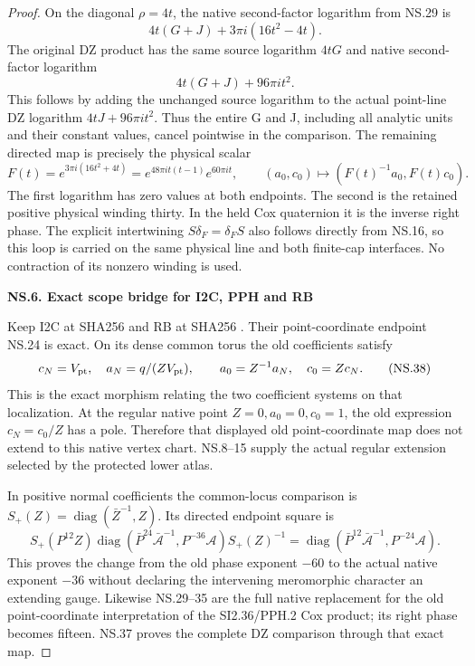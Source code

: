 \begin{proof}
On the diagonal \(\rho=4t\), the native second-factor logarithm
from NS.29 is
\[
       4t(G+J)+3\pi i(16t^2-4t).
\]
The original DZ product has the same source logarithm \(4tG\)
and native second-factor logarithm
\[
                         4t(G+J)+96\pi it^2.
\]
This follows by adding the unchanged source logarithm to the actual
point-line DZ logarithm \(4tJ+96\pi it^2\). Thus the entire G and J,
including all analytic units and their constant values, cancel
pointwise in the comparison. The remaining directed map is precisely
the physical scalar
\[
 F(t)=e^{3\pi i(16t^2+4t)}
     =e^{48\pi it(t-1)}e^{60\pi it},\qquad
 (a_0,c_0)\mapsto(F(t)^{-1}a_0,F(t)c_0).
 \tag{NS.37}
\]
The first logarithm has zero values at both endpoints. The second is
the retained positive physical winding thirty. In the held Cox
quaternion it is the inverse right phase. The explicit intertwining
\(S\delta_F=\delta_F S\) also follows directly from NS.16, so this
loop is carried on the same physical line and both finite-cap
interfaces. No contraction of its nonzero winding is used.

\par

\medskip\noindent\textbf{NS.6. Exact scope bridge for I2C, PPH and RB}

\par\nobreak

Keep I2C at SHA256
and RB at SHA256
.
Their point-coordinate endpoint NS.24 is exact. On its dense common
torus the old coefficients satisfy
\[
 c_N=V_{\rm pt},\quad a_N=q/(ZV_{\rm pt}),\qquad
 a_0=Z^{-1}a_N,\quad c_0=Zc_N.
 \tag{NS.38}
\]
This is the exact morphism relating the two coefficient systems on
that localization. At the regular native point \(Z=0,a_0=0,c_0=1\),
the old expression \(c_N=c_0/Z\) has a pole. Therefore that displayed
old point-coordinate map does not extend to this native vertex chart.
NS.8--15 supply the actual regular extension selected by the protected
lower atlas.

In positive normal coefficients the common-locus comparison is
\(S_+(Z)=\operatorname{diag}(\bar Z^{-1},Z)\). Its directed endpoint
square is
\[
 S_+(P^{12}Z)
 \operatorname{diag}(\bar P^{24}\bar{\mathcal A}^{-1},
                         P^{-36}\mathcal A)
 S_+(Z)^{-1}
 =\operatorname{diag}(\bar P^{12}\bar{\mathcal A}^{-1},
                         P^{-24}\mathcal A).
 \tag{NS.39}
\]
This proves the change from the old phase exponent \(-60\) to the
actual native exponent \(-36\) without declaring the intervening
meromorphic character an extending gauge. Likewise NS.29--35 are
the full native replacement for the old point-coordinate interpretation
of the SI2.36/PPH.2 Cox product; its right phase becomes fifteen.
NS.37 proves the complete DZ comparison through that exact map.


\end{proof}
